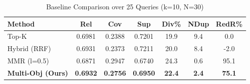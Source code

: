 \begin{table}[htbp]
\centering
\caption{Baseline Comparison over 25 Queries (k=10, N=30)}
\label{tab:baseline_comparison}
\begin{tabular}{l | c c c | c c c}
\hline
\textbf{Method} & \textbf{Rel} & \textbf{Cov} & \textbf{Sup} & \textbf{Div\%} & \textbf{NDup} & \textbf{RedR\%} \\
\hline
Top-K & 0.6981 & 0.2388 & 0.7201 & 19.9 & 9.4 & 0.0 \\
Hybrid (RRF) & 0.6931 & 0.2373 & 0.7211 & 20.0 & 8.4 & -2.0 \\
MMR (l=0.5) & 0.6871 & 0.2947 & 0.6740 & 24.3 & 0.6 & 95.1 \\
\textbf{Multi-Obj (Ours)} & \textbf{0.6932} & \textbf{0.2756} & \textbf{0.6950} & \textbf{22.4} & \textbf{2.4} & \textbf{75.1} \\
\hline
\end{tabular}
\end{table}